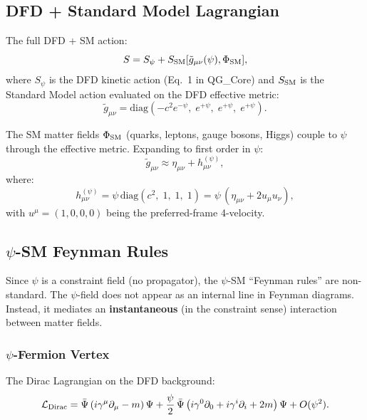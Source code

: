 \documentclass[11pt,a4paper]{article}
\begin{document}
\subsection{DFD + Standard Model Lagrangian}
\label{sec:DFD-SM}

The full DFD + SM action:
\begin{equation}\label{eq:DFD-SM}
S = S_\psi + S_{\rm SM}[\tilde{g}_{\mu\nu}(\psi), \Phi_{\rm SM}],
\end{equation}
where $S_\psi$ is the DFD kinetic action (Eq.~1 in QG\_Core) and $S_{\rm SM}$ is the Standard Model action evaluated on the DFD effective metric:
\begin{equation}
\tilde{g}_{\mu\nu} = \text{diag}(-c^2 e^{-\psi},\;e^{+\psi},\;e^{+\psi},\;e^{+\psi}).
\end{equation}

The SM matter fields $\Phi_{\rm SM}$ (quarks, leptons, gauge bosons, Higgs) couple to $\psi$ through the effective metric. Expanding to first order in $\psi$:
\begin{equation}
\tilde{g}_{\mu\nu} \approx \eta_{\mu\nu} + h_{\mu\nu}^{(\psi)},
\end{equation}
where:
\begin{equation}
h_{\mu\nu}^{(\psi)} = \psi\,\text{diag}(c^2,\;1,\;1,\;1) = \psi\,(\eta_{\mu\nu} + 2u_\mu u_\nu),
\end{equation}
with $u^\mu = (1,0,0,0)$ being the preferred-frame 4-velocity.

\subsection{$\psi$-SM Feynman Rules}
\label{sec:feynman-rules}

Since $\psi$ is a constraint field (no propagator), the $\psi$-SM ``Feynman rules'' are non-standard. The $\psi$-field does not appear as an internal line in Feynman diagrams. Instead, it mediates an \textbf{instantaneous} (in the constraint sense) interaction between matter fields.

\subsubsection{$\psi$-Fermion Vertex}

The Dirac Lagrangian on the DFD background:
\begin{equation}
\mathcal{L}_{\rm Dirac} = \bar\Psi\left(i\gamma^\mu\partial_\mu - m\right)\Psi
+ \frac{\psi}{2}\,\bar\Psi\left(i\gamma^0\partial_0 + i\gamma^i\partial_i + 2m\right)\Psi + O(\psi^2).
\end{equation}
\end{document}
